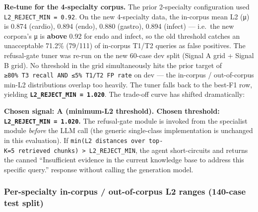 \documentclass[
  american,
  a4paper,
]{article}
\begin{document}
\textbf{Re-tune for the 4-specialty corpus.} The prior 2-specialty
configuration used \texttt{L2\_REJECT\_MIN\ =\ 0.92}. On the new
4-specialty data, the in-corpus mean L2 (μ) is 0.874 (cardio), 0.894
(endo), 0.880 (gastro), 0.894 (infect) --- i.e.~the new corpora's μ is
\textbf{above} 0.92 for endo and infect, so the old threshold catches an
unacceptable 71.2\% (79/111) of in-corpus T1/T2 queries as false
positives. The refusal-gate tuner was re-run on the new 60-case dev
split (Signal A grid + Signal B grid). No threshold in the grid
simultaneously hits the prior target of
\texttt{≥80\%\ T3\ recall\ AND\ ≤5\%\ T1/T2\ FP\ rate} on dev --- the
in-corpus / out-of-corpus min-L2 distributions overlap too heavily. The
tuner falls back to the best-F1 row, yielding
\textbf{\texttt{L2\_REJECT\_MIN\ =\ 1.020}}. The trade-off curve has
shifted dramatically:

\textbf{Chosen signal: A (minimum-L2 threshold). Chosen threshold:
\texttt{L2\_REJECT\_MIN\ =\ 1.020}.} The refusal-gate module is invoked
from the specialist module \emph{before} the LLM call (the generic
single-class implementation is unchanged in this evaluation). If
\texttt{min(L2\ distances\ over\ top-K=5\ retrieved\ chunks)\ \textgreater{}\ L2\_REJECT\_MIN},
the agent short-circuits and returns the canned ``Insufficient evidence
in the current knowledge base to address this specific query.'' response
without calling the generation model.

\subsubsection{Per-specialty in-corpus / out-of-corpus L2 ranges
(140-case test
split)}\label{per-specialty-in-corpus-out-of-corpus-l2-ranges-140-case-test-split}
\end{document}
